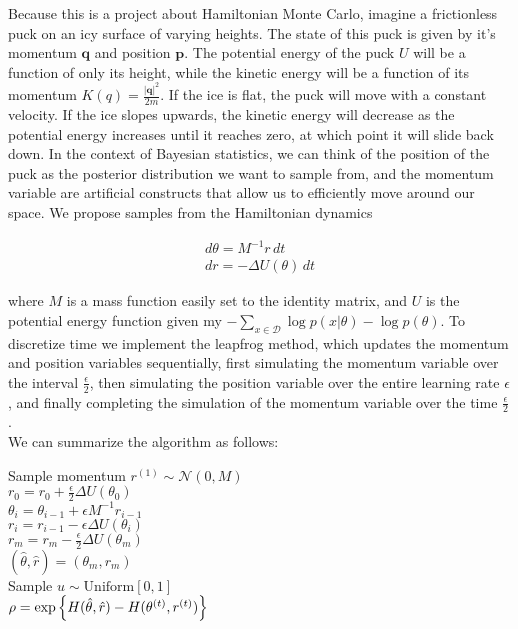 Because this is a project about Hamiltonian Monte Carlo, imagine a frictionless puck on an icy surface of varying heights. The state of this puck is given by it's momentum $\bm{q}$ and position $\bm{p}$. The potential energy of the puck $U$ will be a function of only its height, while the kinetic energy will be a function of its momentum $K(q)=\frac{|\bm{q}|^2}{2m}$. If the ice is flat, the puck will move with a constant velocity. If the ice slopes upwards, the kinetic energy will decrease as the potential energy increases until it reaches zero, at which point it will slide back down. In the context of Bayesian statistics, we can think of the position of the puck as the posterior distribution we want to sample from, and the momentum variable are artificial constructs that allow us to efficiently move around our space. We propose samples from the Hamiltonian dynamics

\begin{gather*}
	d\theta=M^{-1}r\,dt\\
	dr = -\Delta U(\theta)\,dt
\end{gather*}

where $M$ is a mass function easily set to the identity matrix, and $U$ is the potential energy function given my $-\sum_{x\in\mathcal{D}}\log p(x|\theta)-\log p(\theta)$. To discretize time we implement the leapfrog method, which updates the momentum and position variables sequentially, first simulating the momentum variable over the interval $\frac{\epsilon}{2}$, then simulating the position variable over the entire learning rate $\epsilon$, and finally completing the simulation of the momentum variable over the time $\frac{\epsilon}{2}$.
\\

We can summarize the algorithm as follows:

\begin{algorithm}[H]
	 {
		Sample momentum $r^{(1)}\sim\mathcal{N}(0, M)$\\
		$r_0=r_0+\frac{\epsilon}{2}\Delta U(\theta_0)$\\
		 {
			$\theta_i=\theta_{i-1}+\epsilon M^{-1}r_{i-1}$\\
			$r_i = r_{i-1} - \epsilon  \Delta U(\theta_i)$\\
		}
		$r_m = r_m -\frac{\epsilon}{2}\Delta U(\theta_m)$\\
		$(\hat{\theta}, \hat{r})=(\theta_m,r_m)$\\
		Sample $u\sim\mathrm{Uniform}[0, 1]$\\
		$\rho = \exp\left\lbrace H(\hat{\theta}, \hat{r})-H(\theta^{(t)}, r^{(t)}) \right\rbrace$\\
	}
\end{algorithm}




